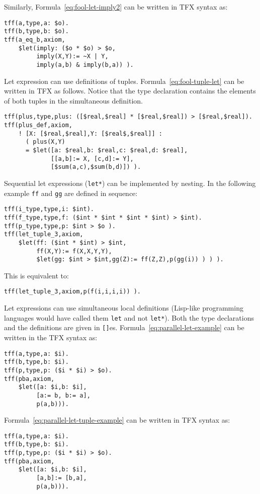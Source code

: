 \documentclass{easychair}
\begin{document}
Similarly, Formula~\ref{eq:fool-let-imply2} can be written in TFX syntax as:
\begin{verbatim}
tff(a,type,a: $o).
tff(b,type,b: $o).
tff(a_eq_b,axiom,
    $let(imply: ($o * $o) > $o,
         imply(X,Y):= ~X | Y,
         imply(a,b) & imply(b,a)) ).
\end{verbatim}

Let expression can use definitions of tuples. 
Formula~\ref{eq:fool-tuple-let} can be written in TFX as follows. 
Notice that the type declaration contains the elements of both tuples in 
the simultaneous definition.
\begin{verbatim}
tff(plus,type,plus: ([$real,$real] * [$real,$real]) > [$real,$real]).
tff(plus_def,axiom,
    ! [X: [$real,$real],Y: [$real$,$real]] :
      ( plus(X,Y) 
      = $let([a: $real,b: $real,c: $real,d: $real],
             [[a,b]:= X, [c,d]:= Y],
             [$sum(a,c),$sum(b,d)]) ).
\end{verbatim}

Sequential let expressions (\verb'let*') can be implemented by nesting. 
In the following example {\tt ff} and {\tt gg} are defined in sequence:
\begin{verbatim}
tff(i_type,type,i: $int).
tff(f_type,type,f: ($int * $int * $int * $int) > $int).
tff(p_type,type,p: $int > $o ).
tff(let_tuple_3,axiom,
    $let(ff: ($int * $int) > $int,
         ff(X,Y):= f(X,X,Y,Y),
         $let(gg: $int > $int,gg(Z):= ff(Z,Z),p(gg(i)) ) ) ).
\end{verbatim}
This is equivalent to:
\begin{verbatim}
tff(let_tuple_3,axiom,p(f(i,i,i,i)) ).
\end{verbatim}

Let expressions can use simultaneous local definitions
(Lisp-like programming languages would have called them \verb'let' and 
not \verb'let*').
Both the type declarations and the definitions are given in {\tt []}es. 
Formula~\ref{eq:parallel-let-example} can be written in the TFX syntax as:
\begin{verbatim}
tff(a,type,a: $i).
tff(b,type,b: $i).
tff(p,type,p: ($i * $i) > $o).
tff(pba,axiom,
    $let([a: $i,b: $i],
         [a:= b, b:= a],
         p(a,b))).
\end{verbatim}

Formula~\ref{eq:parallel-let-tuple-example} can be written in TFX syntax as:
\begin{verbatim}
tff(a,type,a: $i).
tff(b,type,b: $i).
tff(p,type,p: ($i * $i) > $o).
tff(pba,axiom,
    $let([a: $i,b: $i],
         [a,b]:= [b,a],
         p(a,b))).
\end{verbatim}
\end{document}
